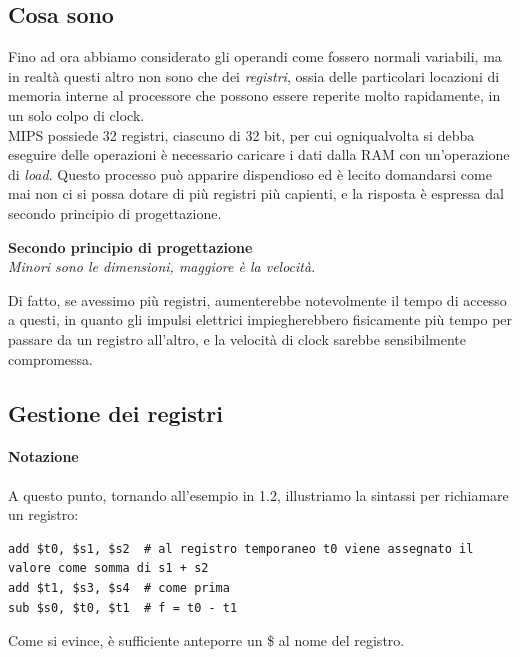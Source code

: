 \documentclass[class=book, crop=false, oneside]{standalone}
\begin{document}
\subsection*{Cosa sono}

Fino ad ora abbiamo considerato gli operandi come fossero normali variabili, ma in realtà questi altro non sono che dei \emph{registri}, ossia delle particolari locazioni di memoria interne al processore che possono essere reperite molto rapidamente, in un solo colpo di clock.\\

MIPS possiede 32 registri, ciascuno di 32 bit, per cui ogniqualvolta si debba eseguire delle operazioni è necessario caricare i dati dalla RAM con un'operazione di \emph{load}. Questo processo può apparire dispendioso ed è lecito domandarsi come mai non ci si possa dotare di più registri più capienti, e la risposta è espressa dal secondo principio di progettazione.

\vspace{8pt}
\begin{tcolorbox}
\centering
\textbf{Secondo principio di progettazione}\\
\emph{Minori sono le dimensioni, maggiore è la velocità}.
\end{tcolorbox}
\vspace{5pt}

Di fatto, se avessimo  più registri, aumenterebbe notevolmente il tempo di accesso a questi, in quanto gli impulsi elettrici impiegherebbero fisicamente più tempo per passare da un registro all'altro, e la velocità di clock sarebbe sensibilmente compromessa.

\subsection*{Gestione dei registri}

\paragraph{Notazione}
A questo punto, tornando all'esempio in 1.2, illustriamo la sintassi per richiamare un registro:
\begin{verbatim}
add $t0, $s1, $s2  # al registro temporaneo t0 viene assegnato il valore come somma di s1 + s2
add $t1, $s3, $s4  # come prima
sub $s0, $t0, $t1  # f = t0 - t1
\end{verbatim}
Come si evince, è sufficiente anteporre un \$ al nome del registro.
\end{document}
